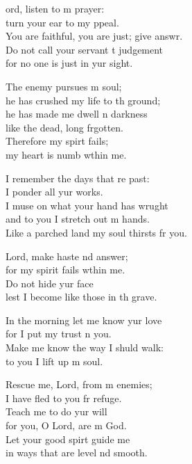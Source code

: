 \settowidth{\versewidth}{You are faithful, you are just; give answer. +}
\begin{psalmverse}%
  \begin{patverse}
    ord, listen to m prayer:\Med\\
    turn your ear to my ppeal.\\
    You are faithful, you are just; give answr.\Flex\\
    Do not call your servant t judgement\Med\\
    for no one is just in yur sight.

    The enemy pursues m soul;\Med\\
    he has crushed my life to th ground;\\
    he has made me dwell \pointup{\i}n darkness\Med\\
    like the dead, long frgotten.\\
    Therefore my spir\pointup{\i}t fails;\Med\\
    my heart is numb w\pointup{\i}thin me.

    I remember the days that re past:\Med\\
    I ponder all yur works.\\
    I muse on what your hand has wrught\Flex\\
    and to you I stretch out m hands.\Med\\
    Like a parched land my soul thirsts fr you.

    Lord, make haste nd answer;\Med\\
    for my spirit fails w\pointup{\i}thin me.\\
    Do not hide yur face\Med\\
    lest I become like those in th grave.

    In the morning let me know yur love\Med\\
    for I put my trust \pointup{\i}n you.\\
    Make me know the way I shuld walk:\Med\\
    to you I lift up m soul.

    Rescue me, Lord, from m enemies;\Med\\
    I have fled to you fr refuge.\\
    Teach me to do yur will\Med\\
    for you, O Lord, are m God.\\
    Let your good spir\pointup{\i}t guide me\Med\\
    in ways that are level nd smooth.


\end{patverse}
\end{psalmverse}
